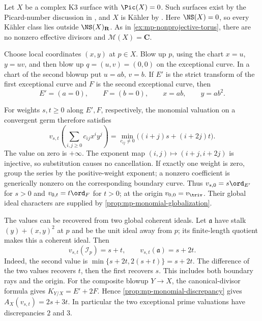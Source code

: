 \begin{example}\label{ex:mp-nonprojective-k3}
Let $X$ be a complex K3 surface with $\Pic(X)=0$.
Such surfaces exist by the Picard-number discussion in
\cite[Chapter~17, Section~1.1]{HuybrechtsK3Surfaces16},
and $X$ is K\"ahler by \cite[p.~139]{Siu83K3}.
Here $\NS(X)=0$, so every K\"ahler class lies outside
$\NS(X)_{\mathbf R}$. As in
\cref{ex:mp-nonprojective-torus}, there are no nonzero
effective divisors and $\mathcal M(X)=\mathbf C$.

\par\noindent\begin{minipage}{\linewidth}
Choose local coordinates $(x,y)$ at $p\in X$. Blow up $p$,
using the chart $x=u$, $y=uv$, and then blow up
$q=(u,v)=(0,0)$ on the exceptional curve. In a chart of
the second blowup put $u=ab$, $v=b$. If $E'$ is the strict
transform of the first exceptional curve and $F$ is the
second exceptional curve, then
\[
 E'=(a=0),\qquad F=(b=0),\qquad x=ab,\qquad y=ab^2.
\]
\end{minipage}\par
For weights $s,t\geq0$ along $E',F$, respectively, the
monomial valuation on a convergent germ therefore satisfies
\[
 v_{s,t}\!\left(\sum_{i,j\geq0}c_{ij}x^iy^j\right)
   =\min_{c_{ij}\ne0}\bigl((i+j)s+(i+2j)t\bigr).
\]
The value on zero is $+\infty$. The exponent map
$(i,j)\mapsto(i+j,i+2j)$ is injective, so substitution causes
no cancellation. If exactly one weight is zero, group the
series by the positive-weight exponent; a nonzero coefficient
is generically nonzero on the corresponding boundary curve.
Thus $v_{s,0}=s\ord_{E'}$ for $s>0$ and
$v_{0,t}=t\ord_F$ for $t>0$; at the origin
$v_{0,0}=v_{\triv}$. Their global ideal characters are supplied
by \cref{prop:mp-monomial-globalization}.

The values can be recovered from two global coherent ideals.
Let $\mathfrak a$ have stalk $(y)+(x,y)^2$ at $p$ and be the
unit ideal away from $p$; its finite-length quotient makes
this a coherent ideal. Then
\[
 v_{s,t}(\mathcal I_p)=s+t,\qquad
 v_{s,t}(\mathfrak a)=s+2t.
\]
Indeed, the second value is
$\min\{s+2t,2(s+t)\}=s+2t$. The difference of the two
values recovers $t$, then the first recovers $s$. This includes
both boundary rays and the origin. For the composite blowup $Y\to X$,
the canonical-divisor formula gives
$K_{Y/X}=E'+2F$. Hence \cref{prop:mp-monomial-discrepancy}
gives $A_X(v_{s,t})=2s+3t$. In particular the two exceptional
prime valuations have discrepancies $2$ and $3$.
\end{example}

